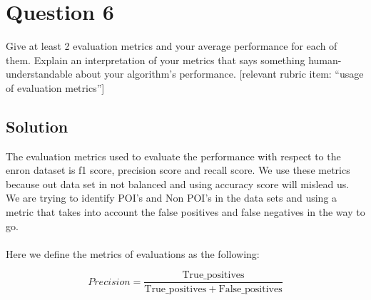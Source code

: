 \documentclass[12pt]{article}%
\begin{document}
\section*{Question 6}
Give at least 2 evaluation metrics and your average performance for each of them.  Explain an interpretation of your metrics that says something human-understandable about your algorithm’s performance. [relevant rubric item: “usage of evaluation metrics”]

\subsection*{Solution}

The evaluation metrics used to evaluate the performance with respect to the enron dataset is f1 score, precision score and recall score. We use these metrics because out data set in not balanced and using accuracy score will mislead us. We are trying to identify POI's and Non POI's in the data sets and using a metric that takes into account the false positives and false negatives in the way to go.
\\
\\
Here we define the metrics of evaluations as the following:

\begin{equation}
Precision = \frac{\mathrm{True\_positives}}{\mathrm{True\_positives} + \mathrm{False\_positives}}
\end{equation}
\end{document}
